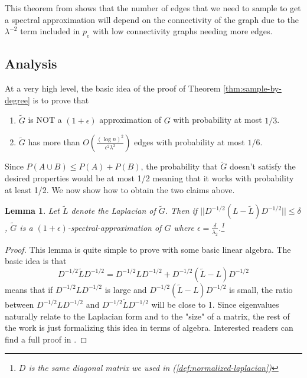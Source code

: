 \documentclass[12pt,twoside]{article}
\newtheorem{lemma}[thm]{Lemma}
\begin{document}
This theorem from \cite{microsoft-summary} shows that the number of edges that we need to sample to get a spectral approximation will depend on the connectivity of the graph due to the $\lambda^{-2}$ term included in $p_e$ with low connectivity graphs needing more edges. 


\subsection{Analysis}

At a very high level, the basic idea of the proof of Theorem \ref{thm:sample-by-degree} is to prove that 

\begin{enumerate}
    \item $\tilde{G}$ is NOT a $(1 + \epsilon)$ approximation of $G$ with probability at most $1/3$.
    \item $\tilde{G}$ has more than $O\left(\frac{(\log n)^2}{\epsilon^2\lambda^2}\right)$ edges with probability at most $1/6$.
\end{enumerate}

Since $P(A \cup B) \leq P(A) + P(B)$, the probability that $\tilde{G}$ doesn't satisfy the desired properties would be at most 1/2 meaning that it works with probability at least 1/2. We now show how to obtain the two claims above. 

\begin{lemma}
\label{lem:spectral-approximation}
Let $\tilde{L}$ denote the Laplacian of $\tilde{G}$. Then if $||D^{-1/2}(L-\tilde{L})D^{-1/2}|| \leq \delta$, $\tilde{G}$ is a $(1+\epsilon)$-spectral-approximation of $G$ where $\epsilon = \frac{\delta}{\lambda_2}$.\footnote{$D$ is the same diagonal matrix we used in (\ref{def:normalized-laplacian})}
\end{lemma}

\begin{proof}
This lemma is quite simple to prove with some basic linear algebra. The basic idea is that 
%
\begin{equation*}
D^{-1/2}\tilde{L}D^{-1/2} = D^{-1/2}LD^{-1/2} + D^{-1/2}(\tilde{L} - L)D^{-1/2}
\end{equation*}
%
means that if $D^{-1/2}LD^{-1/2}$ is large and $D^{-1/2}(\tilde{L} - L)D^{-1/2}$ is small, the ratio between $D^{-1/2}LD^{-1/2}$ and $D^{-1/2}\tilde{L}D^{-1/2}$ will be close to 1. Since eigenvalues naturally relate to the Laplacian form and to the "size" of a matrix, the rest of the work is just formalizing this idea in terms of algebra. Interested readers can find a full proof in \cite{spielman-teng-spectralsparse}.

\end{proof}
\end{document}

